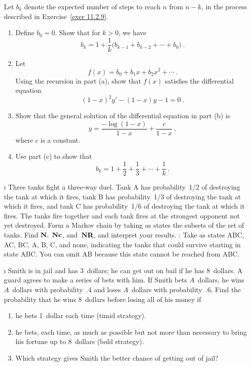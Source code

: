 \begin{LJSItem}
\istar\label{exer 11.2.10.5} Let $b_k$ denote the expected number of steps to
reach
$n$ from $n-k$, in the process described in Exercise~\ref{exer 11.2.9}.
\begin{enumerate}
\item
Define $b_0 = 0$.  Show that for $k > 0$, we have
$$b_k = 1 + \frac 1k \bigl(b_{k-1} + b_{k-2} + \cdots + b_0\bigr)\ .$$
\item
Let 
$$f(x) = b_0 + b_1 x + b_2 x^2 + \cdots\ .$$
Using the recursion in part (a), show that $f(x)$ satisfies the differential
equation
$$(1-x)^2 y' - (1-x) y - 1 = 0\ .$$
\item
Show that the general solution of the differential equation in part (b) is
$$y = \frac{-\log(1-x)}{1-x} + \frac c{1-x}\ ,$$
where $c$ is a constant.
\item
Use part (c) to show that 
$$b_k = 1 + \frac 12 + \frac 13 + \cdots + \frac 1k\ .$$
\end{enumerate}

\i\label{exer 11.2.11} Three tanks fight a three-way duel.  Tank A has 
probability~1/2 of destroying the tank at which it fires, tank B has 
probability~1/3 of destroying the tank at which it fires, and tank C has 
probability~1/6 of destroying the tank at which it fires.  The tanks fire
together 
and each tank fires at the strongest opponent not yet destroyed.  Form a Markov 
chain by taking as states the subsets of the set of tanks.  Find
${\mbox{\bf N}\/},~{\mbox{\bf N}\/}{\mbox{\bf c}\/}$, 
and~${\mbox{\bf N}\/}{\mbox{\bf R}\/}$, and interpret your results.  :
Take as states ABC, AC, BC, A, B, C, and none, indicating the tanks that could
survive starting in state ABC.  You can omit AB because this state cannot be
reached from ABC.

\i\label{exer 11.2.12} Smith is in jail and has 3~dollars; he can get out on
bail if he has 8~dollars.  A guard agrees to make a series of bets with him. 
If
Smith bets $A$~dollars, he wins $A$~dollars with probability~.4 and loses
$A$~dollars with probability~.6.  Find the probability that he wins 8~dollars
before losing all of his money if
\begin{enumerate}
\item he bets 1~dollar each time (timid strategy).

\item he bets, each time, as much as possible but not more than necessary to
bring his fortune up to 8~dollars (bold strategy).

\item Which strategy gives Smith the better chance of getting out of jail?
\end{enumerate}


\end{LJSItem}
